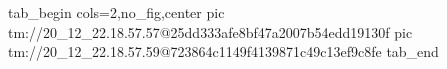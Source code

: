  
 
 
 
 

\qqSecOrig


\ifcmt
  tab_begin cols=2,no_fig,center
    pic tm://20_12_22.18.57.57@25dd333afe8bf47a2007b54edd19130f
    pic tm://20_12_22.18.57.59@723864c1149f4139871c49c13ef9c8fe
  tab_end
\fi


